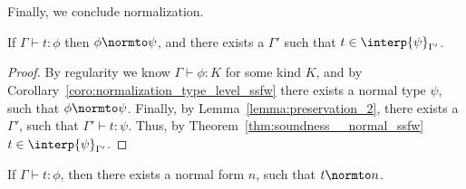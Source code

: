 \noindent
Finally, we conclude normalization.
\begin{thm}
  If $\Gamma \vdash t:\phi$ then $\phi \normto \psi$, and there exists a $\Gamma'$ such that $t \in \interp{\psi}_{\Gamma'}$.
  \label{thm:soundness_term_ssfw}
\end{thm}
\begin{proof}
  By regularity we know $\Gamma \vdash \phi:K$ for some kind $K$, and
  by Corollary~\ref{coro:normalization_type_level_ssfw} there exists a
  normal type $\psi$, such that $\phi \normto \psi$.  Finally, by
  Lemma~\ref{lemma:preservation_2}, there exists a $\Gamma'$, such
  that $\Gamma' \vdash t:\psi$.  Thus, by
  Theorem~\ref{thm:soundness__normal_ssfw} $t \in \interp{\psi}_{\Gamma'}$.
\end{proof}

\begin{corollary}[Normalization]
  If $\Gamma \vdash t:\phi$, then there exists a normal form $n$, such
  that $t \normto n$.
\end{corollary}

